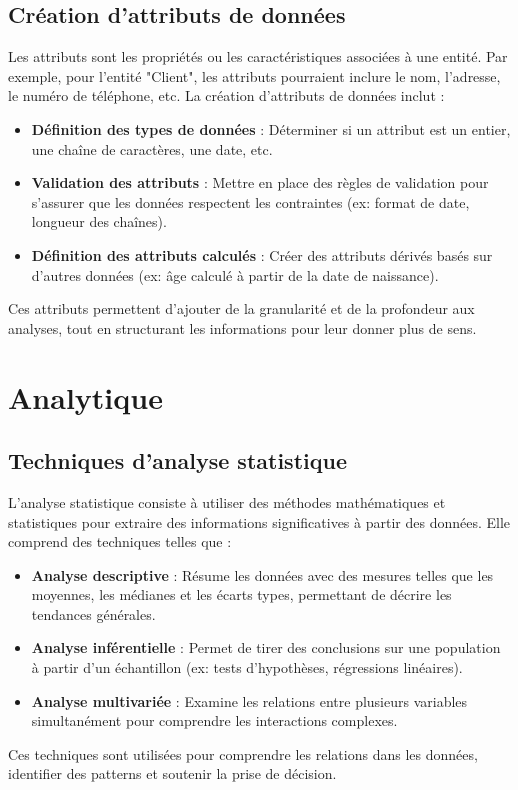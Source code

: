 \documentclass[a4paper,12pt]{report}
\begin{document}
\section{Création d'attributs de données}
Les attributs sont les propriétés ou les caractéristiques associées à une entité. Par exemple, pour l'entité "Client", les attributs pourraient inclure le nom, l'adresse, le numéro de téléphone, etc. La création d'attributs de données inclut :
\begin{itemize}
    \item \textbf{Définition des types de données} : Déterminer si un attribut est un entier, une chaîne de caractères, une date, etc.
    \item \textbf{Validation des attributs} : Mettre en place des règles de validation pour s'assurer que les données respectent les contraintes (ex: format de date, longueur des chaînes).
    \item \textbf{Définition des attributs calculés} : Créer des attributs dérivés basés sur d'autres données (ex: âge calculé à partir de la date de naissance).
\end{itemize}
Ces attributs permettent d'ajouter de la granularité et de la profondeur aux analyses, tout en structurant les informations pour leur donner plus de sens.











\chapter{Analytique}

\section{Techniques d'analyse statistique}
L'analyse statistique consiste à utiliser des méthodes mathématiques et statistiques pour extraire des informations significatives à partir des données. Elle comprend des techniques telles que :
\begin{itemize}
    \item \textbf{Analyse descriptive} : Résume les données avec des mesures telles que les moyennes, les médianes et les écarts types, permettant de décrire les tendances générales.
    \item \textbf{Analyse inférentielle} : Permet de tirer des conclusions sur une population à partir d'un échantillon (ex: tests d'hypothèses, régressions linéaires).
    \item \textbf{Analyse multivariée} : Examine les relations entre plusieurs variables simultanément pour comprendre les interactions complexes.
\end{itemize}
Ces techniques sont utilisées pour comprendre les relations dans les données, identifier des patterns et soutenir la prise de décision.
\end{document}
